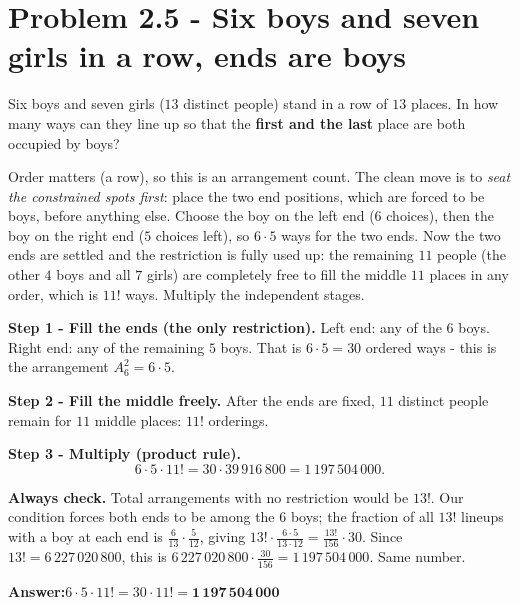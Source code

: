 \documentclass[11pt,a4paper]{article}
\newcommand{\answer}[1]{\begin{answerbox}\centering\textbf{Answer:}\quad #1\end{answerbox}}
\begin{document}
\section*{Problem 2.5 - Six boys and seven girls in a row, ends are boys}

\begin{problembox}[2.5]
Six boys and seven girls ($13$ distinct people) stand in a row of $13$ places. In how many ways
can they line up so that the \textbf{first and the last} place are both occupied by boys?
\end{problembox}

\begin{ideabox}
Order matters (a row), so this is an arrangement count. The clean move is to \emph{seat the
constrained spots first}: place the two end positions, which are forced to be boys, before
anything else. Choose the boy on the left end ($6$ choices), then the boy on the right end ($5$
choices left), so $6\cdot 5$ ways for the two ends. Now the two ends are settled and the
restriction is fully used up: the remaining $11$ people (the other $4$ boys and all $7$ girls)
are completely free to fill the middle $11$ places in any order, which is $11!$ ways. Multiply
the independent stages.
\end{ideabox}

\textbf{Step 1 - Fill the ends (the only restriction).}
Left end: any of the $6$ boys. Right end: any of the remaining $5$ boys. That is $6\cdot 5 = 30$
ordered ways - this is the arrangement $A_6^2 = 6\cdot 5$.

\textbf{Step 2 - Fill the middle freely.}
After the ends are fixed, $11$ distinct people remain for $11$ middle places: $11!$ orderings.

\textbf{Step 3 - Multiply (product rule).}
\[
6\cdot 5\cdot 11! = 30\cdot 39\,916\,800 = 1\,197\,504\,000 .
\]

\textbf{Always check.} Total arrangements with no restriction would be $13!$. Our condition forces
both ends to be among the $6$ boys; the fraction of all $13!$ lineups with a boy at each end is
$\tfrac{6}{13}\cdot\tfrac{5}{12}$, giving $13!\cdot\tfrac{6\cdot5}{13\cdot12} = \tfrac{13!}{156}\cdot30$.
Since $13! = 6\,227\,020\,800$, this is $6\,227\,020\,800\cdot\tfrac{30}{156}=1\,197\,504\,000$. Same number. \checkmark

\answer{$6\cdot 5\cdot 11! = 30\cdot 11! = \mathbf{1\,197\,504\,000}$}
\end{document}
